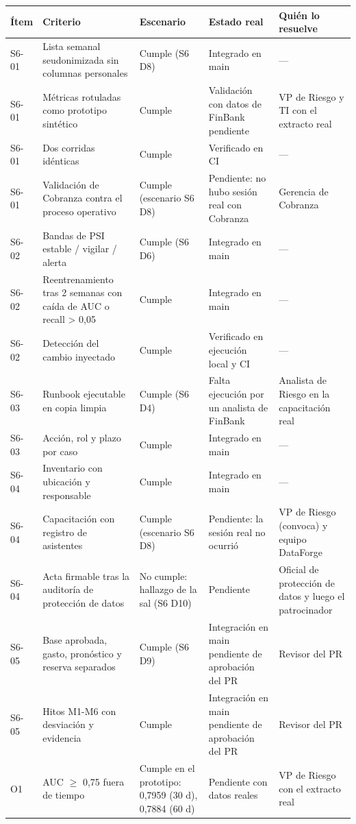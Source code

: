 \scriptsize
\begin{tabularx}{\linewidth}{l X p{2.6cm} p{3.1cm} p{2.6cm}}
\toprule
\textbf{Ítem} & \textbf{Criterio} & \textbf{Escenario} & \textbf{Estado real} & \textbf{Quién lo resuelve} \\
\midrule
S6-01 & Lista semanal seudonimizada sin columnas personales & Cumple (S6 D8) & Integrado en main & — \\
S6-01 & Métricas rotuladas como prototipo sintético & Cumple & Validación con datos de FinBank pendiente & VP de Riesgo y TI con el extracto real \\
S6-01 & Dos corridas idénticas & Cumple & Verificado en CI & — \\
S6-01 & Validación de Cobranza contra el proceso operativo & Cumple (escenario S6 D8) & Pendiente: no hubo sesión real con Cobranza & Gerencia de Cobranza \\
S6-02 & Bandas de PSI estable / vigilar / alerta & Cumple (S6 D6) & Integrado en main & — \\
S6-02 & Reentrenamiento tras 2 semanas con caída de AUC o recall > 0,05 & Cumple & Integrado en main & — \\
S6-02 & Detección del cambio inyectado & Cumple & Verificado en ejecución local y CI & — \\
S6-03 & Runbook ejecutable en copia limpia & Cumple (S6 D4) & Falta ejecución por un analista de FinBank & Analista de Riesgo en la capacitación real \\
S6-03 & Acción, rol y plazo por caso & Cumple & Integrado en main & — \\
S6-04 & Inventario con ubicación y responsable & Cumple & Integrado en main & — \\
S6-04 & Capacitación con registro de asistentes & Cumple (escenario S6 D8) & Pendiente: la sesión real no ocurrió & VP de Riesgo (convoca) y equipo DataForge \\
S6-04 & Acta firmable tras la auditoría de protección de datos & No cumple: hallazgo de la sal (S6 D10) & Pendiente & Oficial de protección de datos y luego el patrocinador \\
S6-05 & Base aprobada, gasto, pronóstico y reserva separados & Cumple (S6 D9) & Integración en main pendiente de aprobación del PR & Revisor del PR \\
S6-05 & Hitos M1-M6 con desviación y evidencia & Cumple & Integración en main pendiente de aprobación del PR & Revisor del PR \\
O1 & AUC $\geq$ 0,75 fuera de tiempo & Cumple en el prototipo: 0,7959 (30 d), 0,7884 (60 d) & Pendiente con datos reales & VP de Riesgo con el extracto real \\

\end{tabularx}
